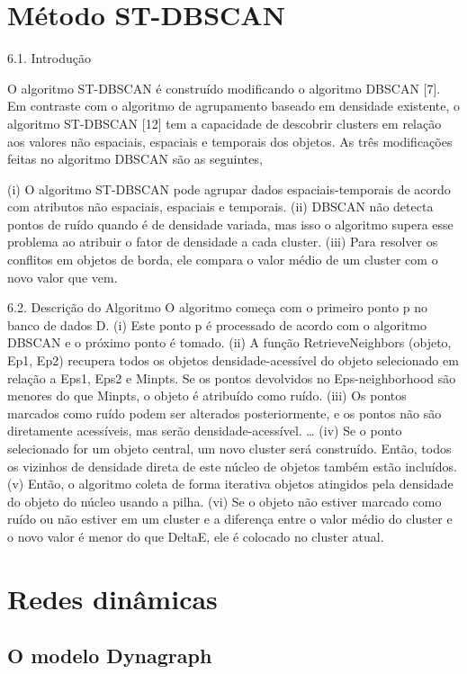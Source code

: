 \section{Método ST-DBSCAN}
\label{stdbscan}

6.1. Introdução

O algoritmo ST-DBSCAN é construído modificando o algoritmo DBSCAN [7]. Em contraste com o algoritmo de agrupamento baseado em densidade existente, o algoritmo ST-DBSCAN [12] tem a capacidade de descobrir clusters em relação aos valores não espaciais, espaciais e temporais dos objetos. As três modificações feitas no algoritmo DBSCAN são as seguintes,

(i) O algoritmo ST-DBSCAN pode agrupar dados espaciais-temporais de acordo com atributos não espaciais, espaciais e temporais.
(ii) DBSCAN não detecta pontos de ruído quando é de densidade variada, mas isso o algoritmo supera esse problema ao atribuir o fator de densidade a cada cluster.
(iii) Para resolver os conflitos em objetos de borda, ele compara o valor médio de um cluster com o novo valor que vem.

6.2. Descrição do Algoritmo
O algoritmo começa com o primeiro ponto p no banco de dados D.
(i) Este ponto p é processado de acordo com o algoritmo DBSCAN e o próximo ponto é tomado.
(ii) A função RetrieveNeighbors (objeto, Ep1, Ep2) recupera todos os objetos densidade-acessível do objeto selecionado em relação a Eps1, Eps2 e Minpts. Se os pontos devolvidos no Eps-neighborhood são menores do que Minpts, o objeto é atribuído como ruído.
(iii) Os pontos marcados como ruído podem ser alterados posteriormente, e os pontos não são diretamente acessíveis, mas serão densidade-acessível.
…
(iv) Se o ponto selecionado for um objeto central, um novo cluster será construído. Então, todos os vizinhos de densidade direta de este núcleo de objetos também estão incluídos.
(v) Então, o algoritmo coleta de forma iterativa objetos atingidos pela densidade do objeto do núcleo usando a pilha.
(vi) Se o objeto não estiver marcado como ruído ou não estiver em um cluster e a diferença
entre o valor médio do cluster e o novo valor é menor do que DeltaE, ele é colocado no cluster atual.

\section{Redes dinâmicas}
 \label{redes-dinamicas} 
\subsection{O modelo Dynagraph}
